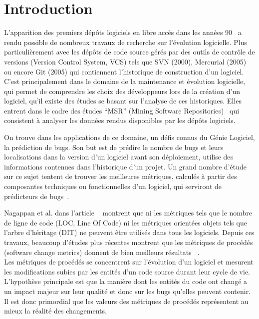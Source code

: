 \section{Introduction}
\label{sec:intro}

L'apparition des premiers dépôts logiciels en libre accès dans les années 90~\cite{list_vcs} a rendu possible de nombreux travaux de recherche sur l'évolution logicielle. Plus particulièrement avec les dépôts de code source gérés par des outils de contrôle de versions (Version Control System, VCS) tels que  SVN (2000), Mercurial (2005) ou encore Git (2005) qui contiennent l'historique de construction d'un logiciel.\\  

C'est principalement dans le domaine de la maintenance et évolution logicielle, qui permet de comprendre les choix des développeurs lors de la création d'un logiciel, qu'il existe des études se basant sur l'analyse de ces historiques. Elles entrent dans le cadre des études ``MSR'' (Mining Software Repositories)~\cite{herzig-makingsoftware-2010} qui consistent à analyser les données rendus disponibles par les dépôts logiciels.

On trouve dans les applications de ce domaine, un défis connus du Génie Logiciel, la prédiction de bugs. Son but est de prédire le nombre de bugs et leurs localisations dans la version d'un logiciel avant son déploiement, utilise des informations contenues dans l'historique d'un projet. Un grand nombre d'étude sur ce sujet tentent de trouver les meilleures métriques, calculés à partir des composantes techniques ou fonctionnelles d'un logiciel, qui serviront de prédicteurs de bugs~\cite{fenton_critique_1999}.

Nagappan et al. dans l'article ~\cite{nagappan_mining_2006} montrent que ni les métriques tels que le nombre de ligne de code (LOC, Line Of Code) ni les métriques orientées objets tels que l'arbre d'héritage (DIT) ne peuvent être utilisés dans tous les logiciels. Depuis ces travaux, beaucoup d'études plus récentes montrent que les métriques de procédés (software change metrics) donnent de bien meilleurs résultats ~\cite{nagappan_use_2005,weyuker_too_2008,bird_dont_2011,giger_can_2012}.\\

Les métriques de procédés se concentrent sur l'évolution d'un logiciel et mesurent les modifications subies par les entités d'un code source durant leur cycle de vie. L'hypothèse principale est que la manière dont les entités du code ont changé a un impact majeur sur leur qualité et donc sur les bugs qu'elles peuvent contenir. Il est donc primordial que les valeurs des métriques de procédés représentent au mieux la réalité des changements.

